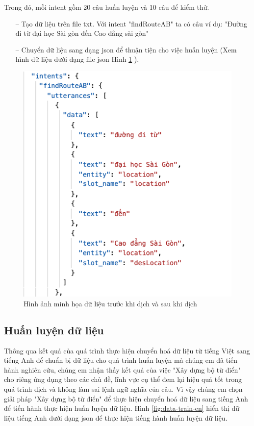 Trong đó, mỗi intent gồm 20 câu huấn luyện và 10 câu để kiểm thử.

\begin{itemize}
    \item[--] Tạo dữ liệu trên file txt. Với intent "findRouteAB" ta có câu ví dụ: "Đường đi từ đại học Sài gòn đến Cao đẳng sài gòn"
    \item[--] Chuyển dữ liệu sang dạng json để thuận tiện cho việc huấn luyện (Xem hình dữ liệu dưới dạng file json Hình \ref{fig:data-train-json} ).
\end{itemize}
\begin{figure}[H]
    \centering
    \includegraphics[width=15cm]{images/Data-train-json.png}
    \caption{Hình ảnh minh họa dữ liệu trước khi dịch và sau khi dịch}
    \label{fig:data-train-json}
\end{figure}

\subsection{Huấn luyện dữ liệu}

Thông qua kết quả của quá trình thực hiện chuyển hoá dữ liệu từ tiếng Việt sang tiếng Anh để chuẩn bị dữ liệu cho quá trình huấn luyện mà chúng em đã tiến hành nghiên cứu, chúng em nhận thấy kết quả của việc "Xây dựng bộ từ điển" cho riêng ứng dụng theo các chủ đề, lĩnh vực cụ thể đem lại hiệu quả tốt trong quá trình dịch và không làm sai lệnh ngữ nghĩa của câu. Vì vậy chúng em chọn giải pháp "Xây dựng bộ từ điển" để thực hiện chuyển hoá dữ liệu sang tiếng Anh để tiến hành thực hiện huấn luyện dữ liệu. Hình \ref{fig:data-train-en} hiển thị dữ liệu tiếng Anh dưới dạng json để thực hiện tiếng hành huấn luyện dữ liệu.


